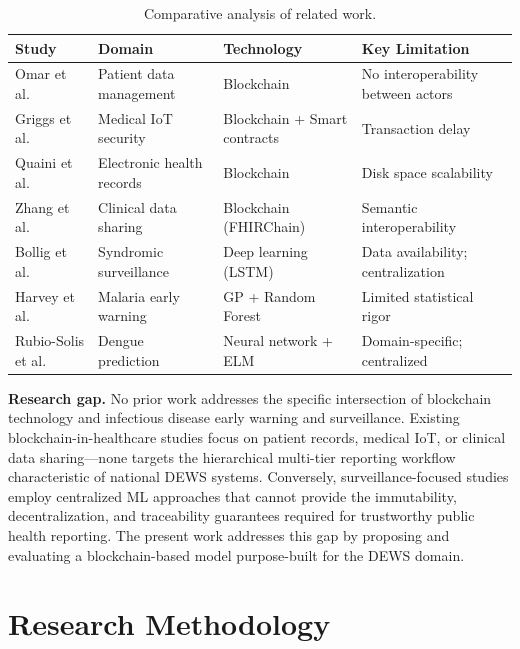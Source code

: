\documentclass[AMA,LATO1COL]{WileyNJD-v2}
\begin{document}
\begin{table}[!ht]
\caption{Comparative analysis of related work.}\label{tab:related}
\begin{tabular*}{\textwidth}{@{\extracolsep\fill}llll@{}}
\toprule
Study & Domain & Technology & Key Limitation \\
\midrule
Omar et al.\cite{omar2019privacy} & Patient data management & Blockchain & No interoperability between actors \\
Griggs et al.\cite{griggs2018healthcare} & Medical IoT security & Blockchain + Smart contracts & Transaction delay \\
Quaini et al.\cite{quaini2018model} & Electronic health records & Blockchain & Disk space scalability \\
Zhang et al.\cite{zhang2018fhirchain} & Clinical data sharing & Blockchain (FHIRChain) & Semantic interoperability \\
Bollig et al.\cite{bollig2020machine} & Syndromic surveillance & Deep learning (LSTM) & Data availability; centralization \\
Harvey et al.\cite{harvey2021predicting} & Malaria early warning & GP + Random Forest & Limited statistical rigor \\
Rubio-Solis et al.\cite{rubiosolis2019zika} & Dengue prediction & Neural network + ELM & Domain-specific; centralized \\
\bottomrule
\end{tabular*}
\end{table}

\textbf{Research gap.} No prior work addresses the specific intersection of blockchain technology and infectious disease early warning and surveillance. Existing blockchain-in-healthcare studies focus on patient records, medical IoT, or clinical data sharing---none targets the hierarchical multi-tier reporting workflow characteristic of national DEWS systems. Conversely, surveillance-focused studies employ centralized ML approaches that cannot provide the immutability, decentralization, and traceability guarantees required for trustworthy public health reporting. The present work addresses this gap by proposing and evaluating a blockchain-based model purpose-built for the DEWS domain.

\section{Research Methodology}\label{sec:methodology}
\end{document}
